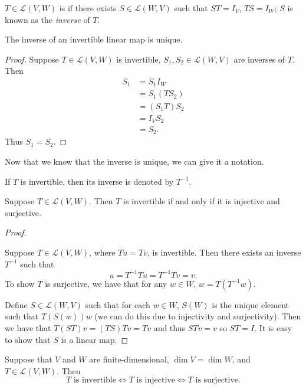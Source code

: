 \begin{definition}[Invertibility]
$T\in\mathcal{L}(V,W)$ is  if there exists $S\in\mathcal{L}(W,V)$ such that $ST=I_V$, $TS=I_W$; $S$ is known as the \emph{inverse} of $T$.
\end{definition}

\begin{proposition}
The inverse of an invertible linear map is unique.
\end{proposition}

\begin{proof}
Suppose $T\in\mathcal{L}(V,W)$ is invertible, $S_1,S_2\in\mathcal{L}(W,V)$ are inverses of $T$. Then
\begin{align*}
S_1&=S_1I_W\\
&=S_1(TS_2)\\
&=(S_1T)S_2\\
&=I_VS_2\\
&=S_2.
\end{align*}
Thus $S_1=S_2$.
\end{proof}

Now that we know that the inverse is unique, we can give it a notation.

\begin{notation}
If $T$ is invertible, then its inverse is denoted by $T^{-1}$.
\end{notation}

\begin{proposition}
Suppose $T\in\mathcal{L}(V,W)$. Then $T$ is invertible if and only if it is injective and surjective.
\end{proposition}

\begin{proof} \

\fbox{$\implies$} Suppose $T\in\mathcal{L}(V,W)$, where $Tu=Tv$, is invertible. Then there exists an inverse $T^{-1}$ such that
\[u=T^{-1}Tu=T^{-1}Tv=v.\]
To show $T$ is surjective, we have that for any $w\in W$, $w=T(T^{-1}w)$.

\fbox{$\impliedby$} Define $S\in\mathcal{L}(W,V)$ such that for each $w\in W$, $S(W)$ is the unique element such that $T(S(w))w$ (we can do this due to injectivity and surjectivity). Then we have that $T(ST)v=(TS)Tv=Tv$ and thus $STv=v$ so $ST=I$. It is easy to show that $S$ is a linear map.
\end{proof}

\begin{proposition}
Suppose that $V$ and $W$ are finite-dimensional, $\dim V=\dim W$, and $T\in\mathcal{L}(V,W)$. Then
\[T\text{ is invertible}\iff T\text{ is injective}\iff T\text{ is surjective}.\]
\end{proposition}


